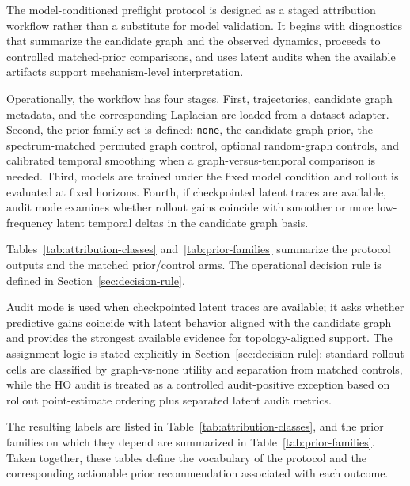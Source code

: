\documentclass[preprint,12pt]{elsarticle}
\begin{document}
The model-conditioned preflight protocol is designed as a staged attribution workflow rather than a substitute for model validation. It begins with diagnostics that summarize the candidate graph and the observed dynamics, proceeds to controlled matched-prior comparisons, and uses latent audits when the available artifacts support mechanism-level interpretation.

Operationally, the workflow has four stages. First, trajectories, candidate graph metadata, and the corresponding Laplacian are loaded from a dataset adapter. Second, the prior family set is defined: \texttt{none}, the candidate graph prior, the spectrum-matched permuted graph control, optional random-graph controls, and calibrated temporal smoothing when a graph-versus-temporal comparison is needed. Third, models are trained under the fixed model condition and rollout is evaluated at fixed horizons. Fourth, if checkpointed latent traces are available, audit mode examines whether rollout gains coincide with smoother or more low-frequency latent temporal deltas in the candidate graph basis.

Tables~\ref{tab:attribution-classes} and~\ref{tab:prior-families} summarize the protocol outputs and the matched prior/control arms. The operational decision rule is defined in Section~\ref{sec:decision-rule}.

Audit mode is used when checkpointed latent traces are available; it asks whether predictive gains coincide with latent behavior aligned with the candidate graph and provides the strongest available evidence for topology-aligned support. The assignment logic is stated explicitly in Section~\ref{sec:decision-rule}: standard rollout cells are classified by graph-vs-none utility and separation from matched controls, while the HO audit is treated as a controlled audit-positive exception based on rollout point-estimate ordering plus separated latent audit metrics.

The resulting labels are listed in Table~\ref{tab:attribution-classes}, and the prior families on which they depend are summarized in Table~\ref{tab:prior-families}. Taken together, these tables define the vocabulary of the protocol and the corresponding actionable prior recommendation associated with each outcome.
\end{document}
